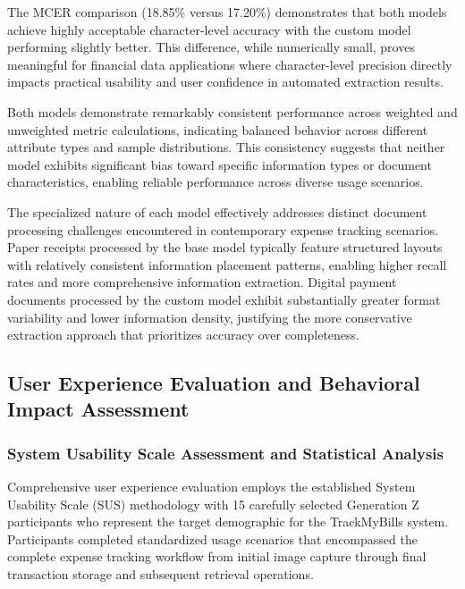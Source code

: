 The MCER comparison (18.85\% versus 17.20\%) demonstrates that both models achieve highly acceptable character-level accuracy with the custom model performing slightly better. This difference, while numerically small, proves meaningful for financial data applications where character-level precision directly impacts practical usability and user confidence in automated extraction results.

Both models demonstrate remarkably consistent performance across weighted and unweighted metric calculations, indicating balanced behavior across different attribute types and sample distributions. This consistency suggests that neither model exhibits significant bias toward specific information types or document characteristics, enabling reliable performance across diverse usage scenarios.

The specialized nature of each model effectively addresses distinct document processing challenges encountered in contemporary expense tracking scenarios. Paper receipts processed by the base model typically feature structured layouts with relatively consistent information placement patterns, enabling higher recall rates and more comprehensive information extraction. Digital payment documents processed by the custom model exhibit substantially greater format variability and lower information density, justifying the more conservative extraction approach that prioritizes accuracy over completeness.

\subsection{User Experience Evaluation and Behavioral Impact Assessment}

\subsubsection{System Usability Scale Assessment and Statistical Analysis}
Comprehensive user experience evaluation employs the established System Usability Scale (SUS) methodology with 15 carefully selected Generation Z participants who represent the target demographic for the TrackMyBills system. Participants completed standardized usage scenarios that encompassed the complete expense tracking workflow from initial image capture through final transaction storage and subsequent retrieval operations.

